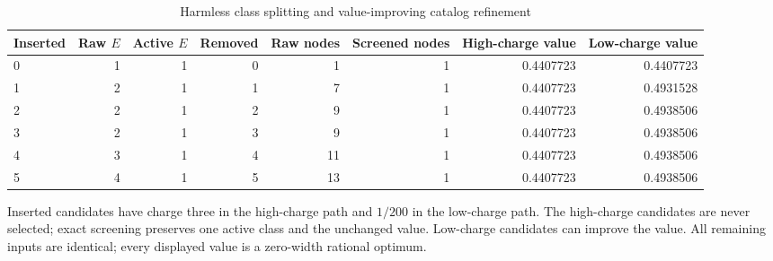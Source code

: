 \begin{table}[p]
\centering\small
\setlength{\tabcolsep}{3.5pt}
\caption{Harmless class splitting and value-improving catalog refinement}\label{tab:r51-refine}
\begin{tabular}{lrrrrrrr}
\toprule
Inserted & Raw $E$ & Active $E$ & Removed & Raw nodes & Screened nodes & High-charge value & Low-charge value \\
\midrule
0 & 1 & 1 & 0 & 1 & 1 & 0.4407723 & 0.4407723 \\
1 & 2 & 1 & 1 & 7 & 1 & 0.4407723 & 0.4931528 \\
2 & 2 & 1 & 2 & 9 & 1 & 0.4407723 & 0.4938506 \\
3 & 2 & 1 & 3 & 9 & 1 & 0.4407723 & 0.4938506 \\
4 & 3 & 1 & 4 & 11 & 1 & 0.4407723 & 0.4938506 \\
5 & 4 & 1 & 5 & 13 & 1 & 0.4407723 & 0.4938506 \\
\bottomrule
\end{tabular}
\par\smallskip\begin{minipage}{\textwidth}\footnotesize Inserted candidates have charge three in the high-charge path and $1/200$ in the low-charge path. The high-charge candidates are never selected; exact screening preserves one active class and the unchanged value. Low-charge candidates can improve the value. All remaining inputs are identical; every displayed value is a zero-width rational optimum.\end{minipage}
\end{table}


